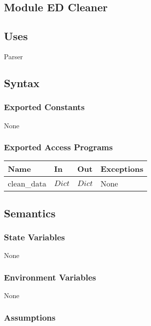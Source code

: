 \documentclass[12pt, titlepage]{article}
\begin{document}
\subsection{Module ED Cleaner}

\subsection{Uses}

Parser

\subsection{Syntax}

\subsubsection{Exported Constants}

None

\subsubsection{Exported Access Programs}

\begin{center}
\begin{tabular}{p{2cm} p{3cm} p{3cm} p{4cm}}
\hline
\textbf{Name} & \textbf{In} & \textbf{Out} & \textbf{Exceptions} \\
\hline
clean\_data & $Dict$ & $Dict$ & None \\
\hline
\end{tabular}
\end{center}

\subsection{Semantics}

\subsubsection{State Variables}

None

\subsubsection{Environment Variables}

None

\subsubsection{Assumptions}
\end{document}
